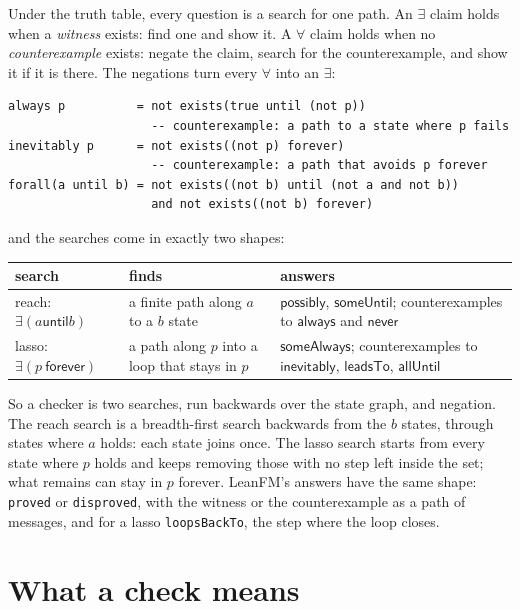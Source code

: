 Under the truth table, every question is a search for one path. An $\exists$ claim holds
when a \emph{witness} exists: find one and show it. A $\forall$ claim holds when no
\emph{counterexample} exists: negate the claim, search for the counterexample, and show it if
it is there. The negations turn every $\forall$ into an $\exists$:
\begin{lstlisting}[language={},basicstyle=\ttfamily\footnotesize]
always p          = not exists(true until (not p))
                    -- counterexample: a path to a state where p fails
inevitably p      = not exists((not p) forever)
                    -- counterexample: a path that avoids p forever
forall(a until b) = not exists((not b) until (not a and not b))
                    and not exists((not b) forever)
\end{lstlisting}
and the searches come in exactly two shapes:
\begin{center}
\begin{tabular}{@{}p{}p{}p{}@{}}
\toprule
search & finds & answers \\
\midrule
reach: $\exists(a \mathbin{\mathsf{until}} b)$ & a finite path along $a$ to a $b$ state &
$\mathsf{possibly}$, $\mathsf{someUntil}$; counterexamples to $\mathsf{always}$ and $\mathsf{never}$ \\
lasso: $\exists(p\ \mathsf{forever})$ & a path along $p$ into a loop that stays in $p$ &
$\mathsf{someAlways}$; counterexamples to $\mathsf{inevitably}$, $\mathsf{leadsTo}$, $\mathsf{allUntil}$ \\
\bottomrule
\end{tabular}
\end{center}
So a checker is two searches, run backwards over the state graph, and negation. The reach
search is a breadth-first search backwards from the $b$ states, through states where $a$ holds:
each state joins once. The lasso search starts from every state where $p$ holds and keeps
removing those with no step left inside the set; what remains can stay in $p$ forever. LeanFM's
answers have the same shape: \texttt{proved} or \texttt{disproved}, with the witness or the
counterexample as a path of messages, and for a lasso \texttt{loopsBackTo}, the step where
the loop closes.

\section{What a check means}

